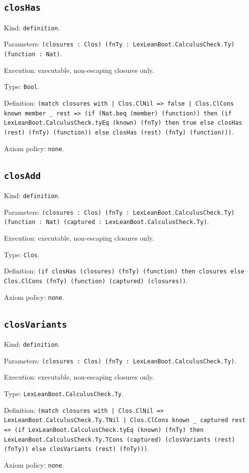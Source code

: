 \documentclass[11pt]{article}
\begin{document}
\subsection*{\texttt{closHas}}
\noindent Kind: \texttt{definition}.\par
\noindent Parameters: \texttt{(closures : Clos) (fnTy : LexLeanBoot.CalculusCheck.Ty) (function : Nat)}.\par
\noindent Execution: executable, non-escaping closures only.\par
\noindent Type: \texttt{Bool}.\par
\noindent Definition: \texttt{(match closures with | Clos.ClNil => false | Clos.ClCons known member \_ rest => (if (Nat.beq (member) (function)) then (if LexLeanBoot.CalculusCheck.tyEq (known) (fnTy) then true else closHas (rest) (fnTy) (function)) else closHas (rest) (fnTy) (function)))}.\par
\noindent Axiom policy: \texttt{none}.\par
\subsection*{\texttt{closAdd}}
\noindent Kind: \texttt{definition}.\par
\noindent Parameters: \texttt{(closures : Clos) (fnTy : LexLeanBoot.CalculusCheck.Ty) (function : Nat) (captured : LexLeanBoot.CalculusCheck.Ty)}.\par
\noindent Execution: executable, non-escaping closures only.\par
\noindent Type: \texttt{Clos}.\par
\noindent Definition: \texttt{(if closHas (closures) (fnTy) (function) then closures else Clos.ClCons (fnTy) (function) (captured) (closures))}.\par
\noindent Axiom policy: \texttt{none}.\par
\subsection*{\texttt{closVariants}}
\noindent Kind: \texttt{definition}.\par
\noindent Parameters: \texttt{(closures : Clos) (fnTy : LexLeanBoot.CalculusCheck.Ty)}.\par
\noindent Execution: executable, non-escaping closures only.\par
\noindent Type: \texttt{LexLeanBoot.CalculusCheck.Ty}.\par
\noindent Definition: \texttt{(match closures with | Clos.ClNil => LexLeanBoot.CalculusCheck.Ty.TNil | Clos.ClCons known \_ captured rest => (if LexLeanBoot.CalculusCheck.tyEq (known) (fnTy) then LexLeanBoot.CalculusCheck.Ty.TCons (captured) (closVariants (rest) (fnTy)) else closVariants (rest) (fnTy)))}.\par
\noindent Axiom policy: \texttt{none}.\par
\end{document}
